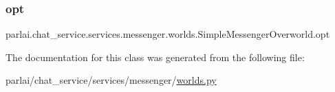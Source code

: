 \subsubsection{\texorpdfstring{opt}{opt}}
{\footnotesize\ttfamily parlai.\+chat\+\_\+service.\+services.\+messenger.\+worlds.\+Simple\+Messenger\+Overworld.\+opt}



The documentation for this class was generated from the following file\+:\begin{DoxyCompactItemize}
\item 
parlai/chat\+\_\+service/services/messenger/\hyperlink{parlai_2chat__service_2services_2messenger_2worlds_8py}{worlds.\+py}\end{DoxyCompactItemize}
